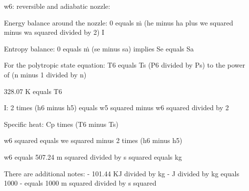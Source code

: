 w6: reversible and adiabatic nozzle:

Energy balance around the nozzle:
0 equals ṁ (he minus ha plus we squared minus wa squared divided by 2) I

Entropy balance:
0 equals ṁ (se minus sa) implies Se equals Sa

For the polytropic state equation:
T6 equals Ts (P6 divided by Ps) to the power of (n minus 1 divided by n)

328.07 K equals T6

I: 2 times (h6 minus h5) equals w5 squared minus w6 squared divided by 2

Specific heat:
Cp times (T6 minus Ts)

w6 squared equals we squared minus 2 times (h6 minus h5)

w6 equals 507.24 m squared divided by s squared equals kg

There are additional notes:
- 101.44 KJ divided by kg
- J divided by kg equals 1000
- equals 1000 m squared divided by s squared